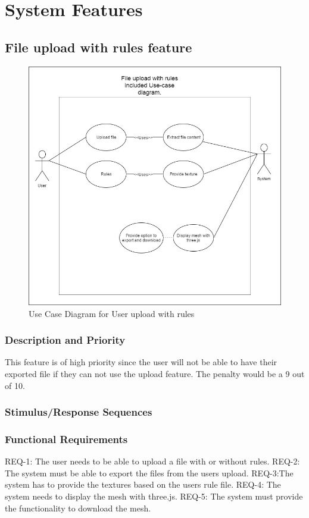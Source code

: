 \documentclass[english]{article}
\begin{document}
	\section{System Features}		
		\subsection{File upload with rules feature}
		\begin{figure}[h]
			\includegraphics[width=\textwidth]{rules.jpg}
			\caption{Use Case Diagram for User upload with rules }
		\end{figure}

			 \subsubsection{Description and Priority}
			 	This feature is of high priority since the user will not be able to have their exported file if they can not use the upload feature. The penalty would be a 9 out of 10.
			 \subsubsection{Stimulus/Response Sequences}
			 	
			 \subsubsection{Functional Requirements}
			 	REQ-1: The user needs to be able to upload a file with or without rules.
			 	REQ-2: The system must be able to export the files from the users upload.
			 	REQ-3:The system has to provide the textures based on the users rule file.
			 	REQ-4: The system needs to display the mesh with three.js.
			 	REQ-5: The system must provide the functionality to download the mesh.
\end{document}
